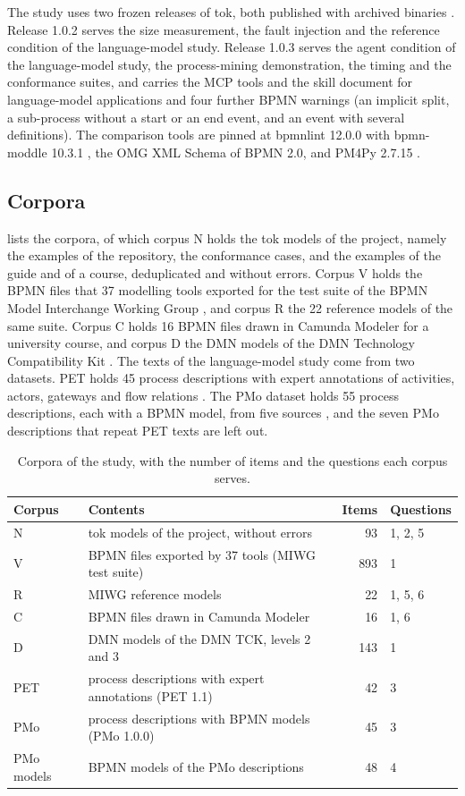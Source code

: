\documentclass[11pt,a4paper]{article}
\begin{document}
The study uses two frozen releases of tok, both published with archived binaries \citep{Deja2026tok}. Release 1.0.2 serves the size measurement, the fault injection and the reference condition of the language-model study. Release 1.0.3 serves the agent condition of the language-model study, the process-mining demonstration, the timing and the conformance suites, and carries the MCP tools and the skill document for language-model applications and four further BPMN warnings (an implicit split, a sub-process without a start or an end event, and an event with several definitions). The comparison tools are pinned at bpmnlint 12.0.0 with bpmn-moddle 10.3.1 \citep{bpmnlint}, the OMG XML Schema of BPMN 2.0, and PM4Py 2.7.15 \citep{Berti2023PM4Py}.

\subsection{Corpora}

 lists the corpora, of which corpus N holds the tok models of the project, namely the examples of the repository, the conformance cases, and the examples of the guide and of a course, deduplicated and without errors. Corpus V holds the BPMN files that 37 modelling tools exported for the test suite of the BPMN Model Interchange Working Group \citep{MIWG}, and corpus R the 22 reference models of the same suite. Corpus C holds 16 BPMN files drawn in Camunda Modeler for a university course, and corpus D the DMN models of the DMN Technology Compatibility Kit \citep{DMNTCK}. The texts of the language-model study come from two datasets. PET holds 45 process descriptions with expert annotations of activities, actors, gateways and flow relations \citep{Bellan2022EDOC,Bellan2023PET}. The PMo dataset holds 55 process descriptions, each with a BPMN model, from five sources \citep{Brissard2025PMo}, and the seven PMo descriptions that repeat PET texts are left out.

\begin{table}[t]
\centering
\small
\caption{Corpora of the study, with the number of items and the questions each corpus serves.}\label{tab:corpora}
\begin{tabularx}{\linewidth}{@{}l X r l@{}}
\toprule
Corpus & Contents & Items & Questions\\
\midrule
N & tok models of the project, without errors & 93 & 1, 2, 5\\
V & BPMN files exported by 37 tools (MIWG test suite) & 893 & 1\\
R & MIWG reference models & 22 & 1, 5, 6\\
C & BPMN files drawn in Camunda Modeler & 16 & 1, 6\\
D & DMN models of the DMN TCK, levels 2 and 3 & 143 & 1\\
PET & process descriptions with expert annotations (PET 1.1) & 42 & 3\\
PMo & process descriptions with BPMN models (PMo 1.0.0) & 45 & 3\\
PMo models & BPMN models of the PMo descriptions & 48 & 4\\
\bottomrule
\end{tabularx}
\end{table}
\end{document}

